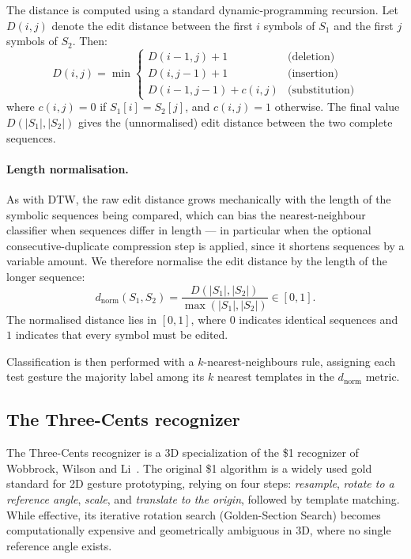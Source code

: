 The distance is computed using a standard dynamic-programming recursion. Let
$D(i, j)$ denote the edit distance between the first $i$ symbols of $S_1$ and
the first $j$ symbols of $S_2$. Then:
\begin{equation}
    D(i, j) = \min
    \begin{cases}
        D(i-1, j) + 1 & \text{(deletion)} \\[2pt]
        D(i, j-1) + 1 & \text{(insertion)} \\[2pt]
        D(i-1, j-1) + c(i, j) & \text{(substitution)}
    \end{cases}
\end{equation}
where $c(i, j) = 0$ if $S_1[i] = S_2[j]$, and $c(i, j) = 1$ otherwise. The
final value $D(|S_1|, |S_2|)$ gives the (unnormalised) edit distance between
the two complete sequences.

\paragraph{Length normalisation.} As with DTW, the raw edit distance
grows mechanically with the length of the symbolic sequences being compared,
which can bias the nearest-neighbour classifier when sequences differ in
length --- in particular when the optional consecutive-duplicate compression
step is applied, since it shortens sequences by a variable amount. We
therefore normalise the edit distance by the length of the longer sequence:
\begin{equation}
\label{eq:ed-norm}
    d_{\text{norm}}(S_1, S_2) =
    \frac{D(|S_1|, |S_2|)}{\max(|S_1|, |S_2|)} \in [0, 1] .
\end{equation}
The normalised distance lies in $[0, 1]$, where $0$ indicates identical
sequences and $1$ indicates that every symbol must be edited.

Classification is then performed with a $k$-nearest-neighbours rule, assigning
each test gesture the majority label among its $k$ nearest templates in the
$d_{\text{norm}}$ metric.


\subsection{The Three-Cents recognizer}

The Three-Cents recognizer is a 3D specialization of the \$1 recognizer of
Wobbrock, Wilson and Li~\cite{Wobbrock2007}. The original \$1 algorithm is a
widely used gold standard for 2D gesture prototyping, relying on four steps:
\emph{resample}, \emph{rotate to a reference angle}, \emph{scale}, and
\emph{translate to the origin}, followed by template matching. While effective,
its iterative rotation search (Golden-Section Search) becomes computationally
expensive and geometrically ambiguous in 3D, where no single reference angle
exists.

